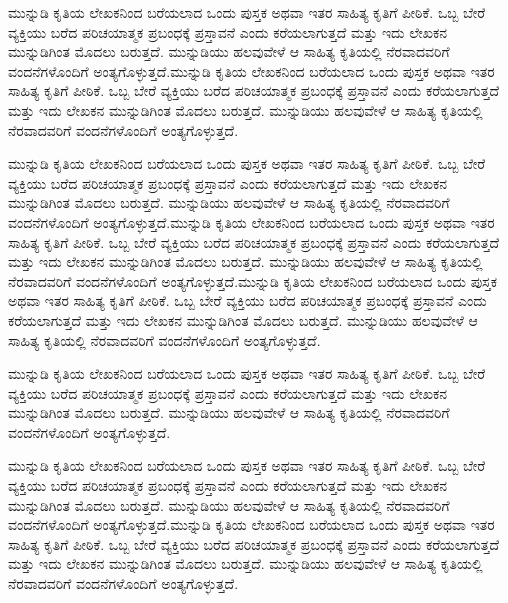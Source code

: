 \documentclass[16pt]{book}
\begin{document}
\begin{center}
\Large\textbf{\color{blue}{ಮುನ್ನುಡಿ}}
\end{center}
\vspace{1cm}
ಮುನ್ನುಡಿ ಕೃತಿಯ ಲೇಖಕನಿಂದ ಬರೆಯಲಾದ ಒಂದು ಪುಸ್ತಕ ಅಥವಾ ಇತರ ಸಾಹಿತ್ಯ ಕೃತಿಗೆ ಪೀಠಿಕೆ. ಒಬ್ಬ ಬೇರೆ ವ್ಯಕ್ತಿಯು ಬರೆದ ಪರಿಚಯಾತ್ಮಕ ಪ್ರಬಂಧಕ್ಕೆ ಪ್ರಸ್ತಾವನೆ ಎಂದು ಕರೆಯಲಾಗುತ್ತದೆ ಮತ್ತು ಇದು ಲೇಖಕನ ಮುನ್ನುಡಿಗಿಂತ ಮೊದಲು ಬರುತ್ತದೆ. ಮುನ್ನುಡಿಯು ಹಲವುವೇಳೆ ಆ ಸಾಹಿತ್ಯ ಕೃತಿಯಲ್ಲಿ ನೆರವಾದವರಿಗೆ ವಂದನೆಗಳೊಂದಿಗೆ ಅಂತ್ಯಗೊಳ್ಳುತ್ತದೆ.ಮುನ್ನುಡಿ ಕೃತಿಯ ಲೇಖಕನಿಂದ ಬರೆಯಲಾದ ಒಂದು ಪುಸ್ತಕ ಅಥವಾ ಇತರ ಸಾಹಿತ್ಯ ಕೃತಿಗೆ ಪೀಠಿಕೆ. ಒಬ್ಬ ಬೇರೆ ವ್ಯಕ್ತಿಯು ಬರೆದ ಪರಿಚಯಾತ್ಮಕ ಪ್ರಬಂಧಕ್ಕೆ ಪ್ರಸ್ತಾವನೆ ಎಂದು ಕರೆಯಲಾಗುತ್ತದೆ ಮತ್ತು ಇದು ಲೇಖಕನ ಮುನ್ನುಡಿಗಿಂತ ಮೊದಲು ಬರುತ್ತದೆ. ಮುನ್ನುಡಿಯು ಹಲವುವೇಳೆ ಆ ಸಾಹಿತ್ಯ ಕೃತಿಯಲ್ಲಿ ನೆರವಾದವರಿಗೆ ವಂದನೆಗಳೊಂದಿಗೆ ಅಂತ್ಯಗೊಳ್ಳುತ್ತದೆ.
\vspace{1cm}

ಮುನ್ನುಡಿ ಕೃತಿಯ ಲೇಖಕನಿಂದ ಬರೆಯಲಾದ ಒಂದು ಪುಸ್ತಕ ಅಥವಾ ಇತರ ಸಾಹಿತ್ಯ ಕೃತಿಗೆ ಪೀಠಿಕೆ. ಒಬ್ಬ ಬೇರೆ ವ್ಯಕ್ತಿಯು ಬರೆದ ಪರಿಚಯಾತ್ಮಕ ಪ್ರಬಂಧಕ್ಕೆ ಪ್ರಸ್ತಾವನೆ ಎಂದು ಕರೆಯಲಾಗುತ್ತದೆ ಮತ್ತು ಇದು ಲೇಖಕನ ಮುನ್ನುಡಿಗಿಂತ ಮೊದಲು ಬರುತ್ತದೆ. ಮುನ್ನುಡಿಯು ಹಲವುವೇಳೆ ಆ ಸಾಹಿತ್ಯ ಕೃತಿಯಲ್ಲಿ ನೆರವಾದವರಿಗೆ ವಂದನೆಗಳೊಂದಿಗೆ ಅಂತ್ಯಗೊಳ್ಳುತ್ತದೆ.ಮುನ್ನುಡಿ ಕೃತಿಯ ಲೇಖಕನಿಂದ ಬರೆಯಲಾದ ಒಂದು ಪುಸ್ತಕ ಅಥವಾ ಇತರ ಸಾಹಿತ್ಯ ಕೃತಿಗೆ ಪೀಠಿಕೆ. ಒಬ್ಬ ಬೇರೆ ವ್ಯಕ್ತಿಯು ಬರೆದ ಪರಿಚಯಾತ್ಮಕ ಪ್ರಬಂಧಕ್ಕೆ ಪ್ರಸ್ತಾವನೆ ಎಂದು ಕರೆಯಲಾಗುತ್ತದೆ ಮತ್ತು ಇದು ಲೇಖಕನ ಮುನ್ನುಡಿಗಿಂತ ಮೊದಲು ಬರುತ್ತದೆ. ಮುನ್ನುಡಿಯು ಹಲವುವೇಳೆ ಆ ಸಾಹಿತ್ಯ ಕೃತಿಯಲ್ಲಿ ನೆರವಾದವರಿಗೆ ವಂದನೆಗಳೊಂದಿಗೆ ಅಂತ್ಯಗೊಳ್ಳುತ್ತದೆ.ಮುನ್ನುಡಿ ಕೃತಿಯ ಲೇಖಕನಿಂದ ಬರೆಯಲಾದ ಒಂದು ಪುಸ್ತಕ ಅಥವಾ ಇತರ ಸಾಹಿತ್ಯ ಕೃತಿಗೆ ಪೀಠಿಕೆ. ಒಬ್ಬ ಬೇರೆ ವ್ಯಕ್ತಿಯು ಬರೆದ ಪರಿಚಯಾತ್ಮಕ ಪ್ರಬಂಧಕ್ಕೆ ಪ್ರಸ್ತಾವನೆ ಎಂದು ಕರೆಯಲಾಗುತ್ತದೆ ಮತ್ತು ಇದು ಲೇಖಕನ ಮುನ್ನುಡಿಗಿಂತ ಮೊದಲು ಬರುತ್ತದೆ. ಮುನ್ನುಡಿಯು ಹಲವುವೇಳೆ ಆ ಸಾಹಿತ್ಯ ಕೃತಿಯಲ್ಲಿ ನೆರವಾದವರಿಗೆ ವಂದನೆಗಳೊಂದಿಗೆ ಅಂತ್ಯಗೊಳ್ಳುತ್ತದೆ.

\vspace{1cm}
ಮುನ್ನುಡಿ ಕೃತಿಯ ಲೇಖಕನಿಂದ ಬರೆಯಲಾದ ಒಂದು ಪುಸ್ತಕ ಅಥವಾ ಇತರ ಸಾಹಿತ್ಯ ಕೃತಿಗೆ ಪೀಠಿಕೆ. ಒಬ್ಬ ಬೇರೆ ವ್ಯಕ್ತಿಯು ಬರೆದ ಪರಿಚಯಾತ್ಮಕ ಪ್ರಬಂಧಕ್ಕೆ ಪ್ರಸ್ತಾವನೆ ಎಂದು ಕರೆಯಲಾಗುತ್ತದೆ ಮತ್ತು ಇದು ಲೇಖಕನ ಮುನ್ನುಡಿಗಿಂತ ಮೊದಲು ಬರುತ್ತದೆ. ಮುನ್ನುಡಿಯು ಹಲವುವೇಳೆ ಆ ಸಾಹಿತ್ಯ ಕೃತಿಯಲ್ಲಿ ನೆರವಾದವರಿಗೆ ವಂದನೆಗಳೊಂದಿಗೆ ಅಂತ್ಯಗೊಳ್ಳುತ್ತದೆ.
\vspace{1cm}
\newpage
\begin{center}
\Large\textbf{\color{blue}{ಸ್ವೀಕೃತಿ}}
\end{center}
\vspace{1cm}
ಮುನ್ನುಡಿ ಕೃತಿಯ ಲೇಖಕನಿಂದ ಬರೆಯಲಾದ ಒಂದು ಪುಸ್ತಕ ಅಥವಾ ಇತರ ಸಾಹಿತ್ಯ ಕೃತಿಗೆ ಪೀಠಿಕೆ. ಒಬ್ಬ ಬೇರೆ ವ್ಯಕ್ತಿಯು ಬರೆದ ಪರಿಚಯಾತ್ಮಕ ಪ್ರಬಂಧಕ್ಕೆ ಪ್ರಸ್ತಾವನೆ ಎಂದು ಕರೆಯಲಾಗುತ್ತದೆ ಮತ್ತು ಇದು ಲೇಖಕನ ಮುನ್ನುಡಿಗಿಂತ ಮೊದಲು ಬರುತ್ತದೆ. ಮುನ್ನುಡಿಯು ಹಲವುವೇಳೆ ಆ ಸಾಹಿತ್ಯ ಕೃತಿಯಲ್ಲಿ ನೆರವಾದವರಿಗೆ ವಂದನೆಗಳೊಂದಿಗೆ ಅಂತ್ಯಗೊಳ್ಳುತ್ತದೆ.ಮುನ್ನುಡಿ ಕೃತಿಯ ಲೇಖಕನಿಂದ ಬರೆಯಲಾದ ಒಂದು ಪುಸ್ತಕ ಅಥವಾ ಇತರ ಸಾಹಿತ್ಯ ಕೃತಿಗೆ ಪೀಠಿಕೆ. ಒಬ್ಬ ಬೇರೆ ವ್ಯಕ್ತಿಯು ಬರೆದ ಪರಿಚಯಾತ್ಮಕ ಪ್ರಬಂಧಕ್ಕೆ ಪ್ರಸ್ತಾವನೆ ಎಂದು ಕರೆಯಲಾಗುತ್ತದೆ ಮತ್ತು ಇದು ಲೇಖಕನ ಮುನ್ನುಡಿಗಿಂತ ಮೊದಲು ಬರುತ್ತದೆ. ಮುನ್ನುಡಿಯು ಹಲವುವೇಳೆ ಆ ಸಾಹಿತ್ಯ ಕೃತಿಯಲ್ಲಿ ನೆರವಾದವರಿಗೆ ವಂದನೆಗಳೊಂದಿಗೆ ಅಂತ್ಯಗೊಳ್ಳುತ್ತದೆ.
\vspace{1cm}
\end{document}
